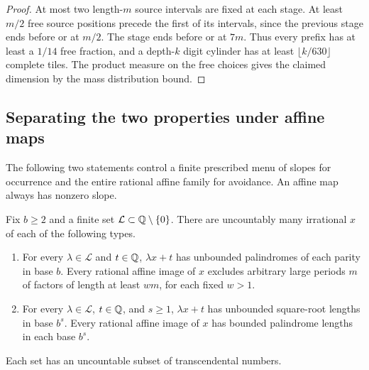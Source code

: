\begin{proof}
At most two length-$m$ source intervals are fixed at each stage. At least $m/2$ free source positions precede the first of its intervals, since the previous stage ends before or at $m/2$. The stage ends before or at $7m$. Thus every prefix has at least a $1/14$ free fraction, and a depth-$k$ digit cylinder has at least $\lfloor k/630\rfloor$ complete tiles. The product measure on the free choices gives the claimed dimension by the mass distribution bound.
\end{proof}

\subsection{Separating the two properties under affine maps}
The following two statements control a finite prescribed menu of slopes for occurrence and the entire rational affine family for avoidance. An affine map always has nonzero slope.

\begin{theorem}\label{thm:affine}
Fix $b\ge2$ and a finite set $\mathcal L\subset\mathbb Q\setminus\{0\}$. There are uncountably many irrational $x$ of each of the following types.
\begin{enumerate}
\item For every $\lambda\in\mathcal L$ and $t\in\mathbb Q$, $\lambda x+t$ has unbounded palindromes of each parity in base $b$. Every rational affine image of $x$ excludes arbitrary large periods $m$ of factors of length at least $wm$, for each fixed $w>1$.
\item For every $\lambda\in\mathcal L$, $t\in\mathbb Q$, and $s\ge1$, $\lambda x+t$ has unbounded square-root lengths in base $b^s$. Every rational affine image of $x$ has bounded palindrome lengths in each base $b^s$.
\end{enumerate}
Each set has an uncountable subset of transcendental numbers.
\end{theorem}

